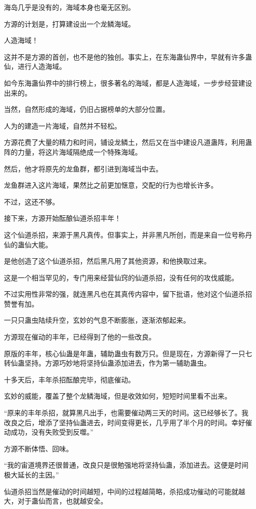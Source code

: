 \begin{this_body}
海岛几乎是没有的，海域本身也毫无区别。

方源的计划是，打算建设出一个龙鳞海域。

人造海域！

这并不是方源的首创，也不是他的独创。事实上，在东海蛊仙界中，早就有许多蛊仙，进行人造海域。

如今东海蛊仙界中的排行榜上，很多著名的海域，都是人造海域，一步步经营建设出来的。

当然，自然形成的海域，仍旧占据榜单的大部分位置。

人为的建造一片海域，自然并不轻松。

方源花费了大量的精力和时间，铺设龙鳞土，然后又在当中建设凡道蛊阵，利用蛊阵的力量，将这片海域隔绝成一个特殊海域。

然后，他才将原先的龙鱼群，都引进到海域当中去。

龙鱼群进入这片海域，果然比之前更加惬意，交配的行为也增长许多。

不过，这还不够。

接下来，方源开始酝酿仙道杀招丰年！

这个仙道杀招，来源于黑凡真传。但事实上，并非黑凡所创，而是来自一位号称丹仙的蛊仙大能。

是他创造了这个仙道杀招，然后黑凡用了其他资源，和他换取过来。

这是一个相当罕见的，专门用来经营仙窍的仙道杀招，没有任何的攻伐威能。

不过实用性非常的强，就连黑凡也在其真传内容中，留下批语，他对这个仙道杀招赞誉有加。

一只只蛊虫陆续升空，玄妙的气息不断膨胀，逐渐浓郁起来。

方源现在催动的丰年，已经得到了他的一些改良。

原版的丰年，核心仙蛊是年蛊，辅助蛊虫有数万只。但是现在，方源新得了一只七转仙蛊坚持。方源巧妙地将坚持仙蛊添加进去，作为第一辅助蛊虫。

十多天后，丰年杀招酝酿完毕，彻底催动。

玄妙的威能，覆盖了整个龙鳞海域，但是收效如何，短短时间里看不出来。

“原来的丰年杀招，就算黑凡出手，也需要催动两三天的时间。这已经够长了。我改良之后，增添了坚持仙蛊进去，时间变得更长，几乎用了半个月的时间。幸好催动成功，没有失败受到反噬。”

方源不断体悟、回味。

“我的宙道境界还很普通，改良只是很勉强地将坚持仙蛊，添加进去。这便是时间极大延长的主因。”

仙道杀招当然是催动的时间越短，中间的过程越简略，杀招成功催动的可能就越大，对于蛊仙而言，也就越安全。


\end{this_body}
